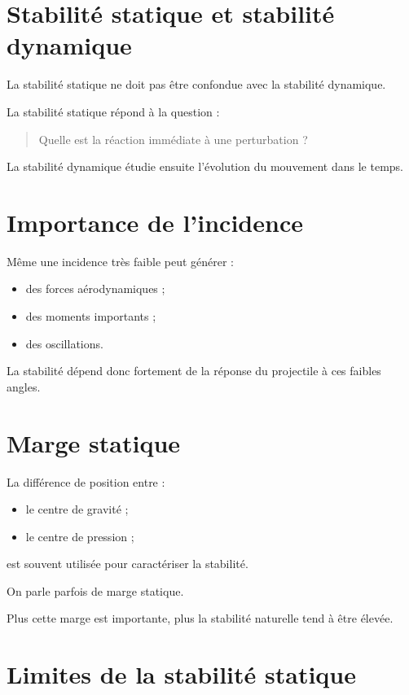 \section{Stabilité statique et stabilité dynamique}

La stabilité statique ne doit pas être confondue avec la stabilité dynamique.

La stabilité statique répond à la question :

\begin{quote}
Quelle est la réaction immédiate à une perturbation ?
\end{quote}

La stabilité dynamique étudie ensuite l'évolution du mouvement dans le temps.

\section{Importance de l'incidence}

Même une incidence très faible peut générer :

\begin{itemize}
    \item des forces aérodynamiques ;
    \item des moments importants ;
    \item des oscillations.
\end{itemize}

La stabilité dépend donc fortement de la réponse du projectile à ces faibles
angles.

\section{Marge statique}

La différence de position entre :

\begin{itemize}
    \item le centre de gravité ;
    \item le centre de pression ;
\end{itemize}

est souvent utilisée pour caractériser la stabilité.

On parle parfois de marge statique.

Plus cette marge est importante, plus la stabilité naturelle tend à être
élevée.

\section{Limites de la stabilité statique}

